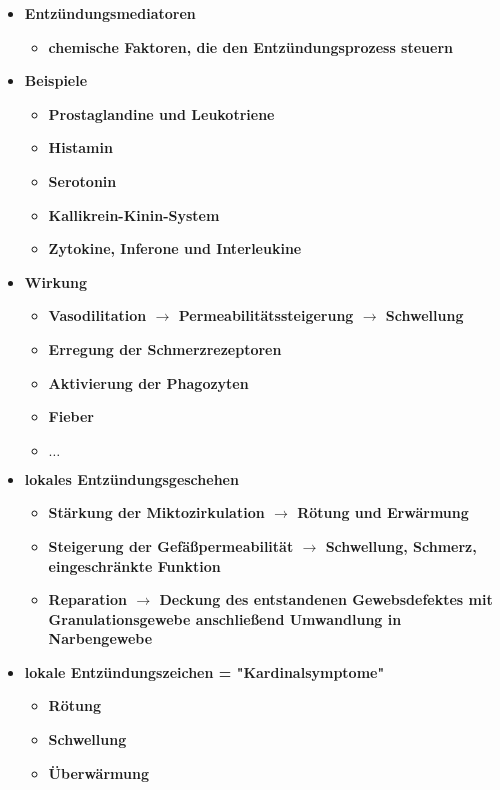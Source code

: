 \begin{itemize}
\begin{itemize}
			\end{itemize}
		\item \textbf{Entzündungsmediatoren}
			\begin{itemize}
				\item \textbf{chemische Faktoren, die den Entzündungsprozess steuern}
			\end{itemize}
		\item \textbf{Beispiele}
			\begin{itemize}
				\item \textbf{Prostaglandine und Leukotriene}
				\item \textbf{Histamin}
				\item \textbf{Serotonin}
				\item \textbf{Kallikrein-Kinin-System}
				\item \textbf{Zytokine, Inferone und Interleukine}
			\end{itemize}
		\item \textbf{Wirkung}
			\begin{itemize}
				\item \textbf{Vasodilitation $\rightarrow$ Permeabilitätssteigerung $\rightarrow$ Schwellung }
				\item \textbf{Erregung der Schmerzrezeptoren}
				\item \textbf{Aktivierung der Phagozyten}
				\item \textbf{Fieber}
				\item \textbf{$\dots$}
			\end{itemize}
		\item \textbf{lokales Entzündungsgeschehen}
			\begin{itemize}
				\item \textbf{Stärkung der Miktozirkulation $\rightarrow$ Rötung und Erwärmung}
				\item \textbf{Steigerung der Gefäßpermeabilität $\rightarrow$ Schwellung, Schmerz, eingeschränkte Funktion}
				\item \textbf{Reparation $\rightarrow$ Deckung des entstandenen Gewebsdefektes mit Granulationsgewebe anschließend Umwandlung in Narbengewebe}
			\end{itemize}
		\item \textbf{lokale Entzündungszeichen = "Kardinalsymptome"}
			\begin{itemize}
				\item \textbf{Rötung}
				\item \textbf{Schwellung}
				\item \textbf{Überwärmung}

\end{itemize}
\end{itemize}
